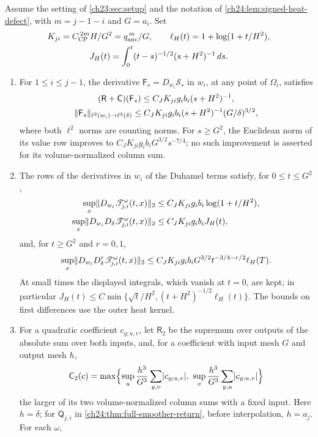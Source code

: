 \begin{theorem}\label{ch24:thm:ancestor-gram-rows}
Assume the setting of \cref{ch23:sec:setup} and the notation of \cref{ch24:lem:signed-heat-defect}, with $m=j-1-i$ and $G=a_i$. Set
\begin{gather*}
 K_{ji}=C_{\mathrm{CP}}^{\,2m}H/G^2=q_{\mathrm{anc}}^{\,m}/G,\qquad
 \ell_H(t)=1+\log(1+t/H^2),\\
 J_H(t)=\int_0^t(t-s)^{-1/2}(s+H^2)^{-1}\,ds.
\end{gather*}
\begin{enumerate}
\item For $1\le i\le j-1$, the derivative $\mathsf F_s=D_{w_i}\mathscr S_s$ in $w_i$, at any point of $\Omega_i$, satisfies
\begin{gather*}
 (\mathsf R+\mathsf C)(\mathsf F_s)\le C_JK_{ji}g_ib_i(s+H^2)^{-1},\\
 \lVert \mathsf F_s\rVert_{\ell^2(w_i)\to\ell^2(\delta)}\le C_JK_{ji}g_ib_i(s+H^2)^{-1}(G/\delta)^{3/2},
\end{gather*}
where both $\ell^2$ norms are counting norms. For $s\ge G^2$, the Euclidean norm of its value row improves to $C_JK_{ji}g_ib_iG^{3/2}s^{-7/4}$; no such improvement is asserted for its volume-normalized column sum.
\item The rows of the derivatives in $w_i$ of the Duhamel terms satisfy, for $0\le t\le G^2$,
\begin{align*}
 \sup_x\lVert D_{w_i}\mathscr T_{j,i}^\omega(t,x)\rVert_2&\le C_JK_{ji}g_ib_i\log(1+t/H^2),\\
 \sup_x\lVert D_{w_i}D_\delta\mathscr T_{j,i}^\omega(t,x)\rVert_2&\le C_JK_{ji}g_ib_iJ_H(t),
\end{align*}
and, for $t\ge G^2$ and $r=0,1$,
\[
 \sup_x\lVert D_{w_i}D_\delta^r\mathscr T_{j,i}^\omega(t,x)\rVert_2\le C_JK_{ji}g_ib_iG^{3/2}t^{-3/4-r/2}\ell_H(T).
\]
At small times the displayed integrals, which vanish at $t=0$, are kept; in particular $J_H(t)\le C\min\{\sqrt t/H^2,(t+H^2)^{-1/2}\ell_H(t)\}$. The bounds on first differences use the outer heat kernel.
\item For a quadratic coefficient $c_{y;u,v}$, let $\mathsf R_2$ be the supremum over outputs of the absolute sum over both inputs, and, for a coefficient with input mesh $G$ and output mesh $h$,
\[
 \mathsf C_2(c)=\max\Bigl\{\sup_u\frac{h^3}{G^3}\sum_{y,v}\abs{c_{y;u,v}},\ \sup_v\frac{h^3}{G^3}\sum_{y,u}\abs{c_{y;u,v}}\Bigr\}
\]
the larger of its two volume-normalized column sums with a fixed input. Here $h=\delta$; for $\mathsf Q_{j,i}$ in \cref{ch24:thm:full-smoother-return}, before interpolation, $h=a_j$. For each $\omega$,

\end{enumerate}
\end{theorem}

